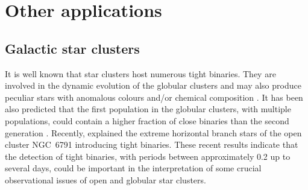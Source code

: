 \documentclass{pasa}%
\newcommand\arcsec{\hbox{$^{\prime\prime}$}}
\begin{document}



\section{Other applications}
\label{Sect:other}




\subsection{Galactic star clusters}

It is well known that star clusters host numerous tight binaries. They are involved in the dynamic evolution of the globular clusters and may also produce peculiar stars with anomalous colours and/or chemical composition \citep{JHL2015}. It has been also predicted that the first population in the globular clusters, with multiple populations, could contain a higher fraction of close binaries than the second generation \citep{Hong+2016}. Recently, \citet{CarBen2017} explained the extreme horizontal branch stars of the open cluster NGC~6791 introducing tight binaries. These recent results indicate that the detection of tight binaries, with periods between approximately 0.2 up to several days, could be important in the interpretation of some crucial observational issues of open and globular star clusters.
\end{document}
